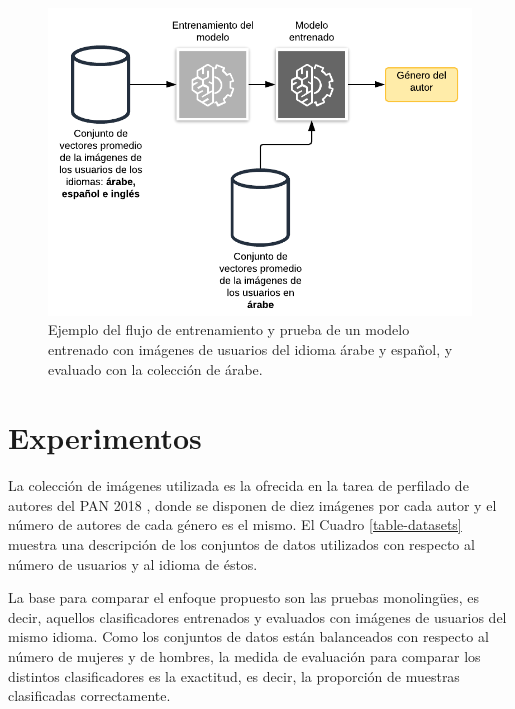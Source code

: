 \documentclass[runningheads]{llncs}
\begin{document}
\begin{figure}[!h]
    \centering
    \includegraphics[scale=0.3]{img/classifier_scheme.png}
    \caption{Ejemplo del flujo de entrenamiento y prueba de un modelo entrenado
    con imágenes de usuarios del idioma árabe y español, y evaluado con la colección
    de árabe.}
    \label{fig:classifier}
\end{figure}


\section{Experimentos}

La colección de imágenes utilizada es la ofrecida en la tarea de perfilado de autores del PAN 2018
\cite{rangel_rosso_montes-y-gomez_potthast_stein}, donde se disponen de diez imágenes por cada autor y el número de autores de cada género es el mismo. El Cuadro \ref{table-datasets}
muestra una descripción de los conjuntos de datos utilizados con respecto al número
de usuarios y al idioma de éstos.

La base para comparar el enfoque propuesto son las pruebas monolingües, es decir, aquellos clasificadores entrenados y evaluados con imágenes de usuarios del mismo idioma.
Como los conjuntos de datos están balanceados con respecto al número de mujeres
y de hombres, la medida de evaluación para comparar los distintos clasificadores
es la exactitud, es decir, la proporción de muestras clasificadas correctamente.
\end{document}
